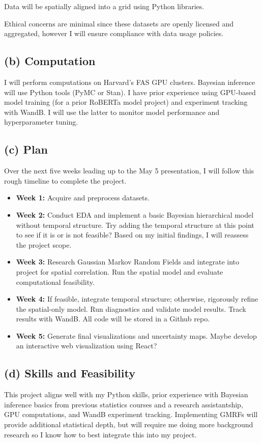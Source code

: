 \documentclass[12pt]{article}
\begin{document}
Data will be spatially aligned into a grid using Python libraries. 


Ethical concerns are minimal since these datasets are openly licensed and aggregated, however I will ensure compliance with data usage policies.

\subsection*{(b) Computation}
I will perform computations on Harvard's FAS GPU clusters. Bayesian inference will use Python tools (PyMC or Stan). I have prior experience using GPU-based model training (for a prior RoBERTa model project) and experiment tracking with WandB. I will use the latter to monitor model performance and hyperparameter tuning.

\subsection*{(c) Plan}
Over the next five weeks leading up to the May 5 presentation, I will follow this rough timeline to complete the project.
\begin{itemize}
    \item \textbf{Week 1:} Acquire and preprocess datasets.
    \item \textbf{Week 2:} Conduct EDA and implement a basic Bayesian hierarchical model without temporal structure. Try adding the temporal structure at this point to see if it is or is not feasible? Based on my initial findings, I will reassess the project scope. 
    \item \textbf{Week 3:} Research Gaussian Markov Random Fields and integrate into project for spatial correlation. Run the spatial model and evaluate computational feasibility.
    \item \textbf{Week 4:} If feasible, integrate temporal structure; otherwise, rigorously refine the spatial-only model. Run diagnostics and validate model results. Track results with WandB. All code will be stored in a Github repo.
    \item \textbf{Week 5:} Generate final visualizations and uncertainty maps. Maybe develop an interactive web visualization using React?
\end{itemize}

\subsection*{(d) Skills and Feasibility}
This project aligns well with my Python skills, prior experience with Bayesian inference basics from previous statistics courses and a research assistantship, GPU computations, and WandB experiment tracking. Implementing GMRFs will provide additional statistical depth, but will require me doing more  background research so I know how to best integrate this into my project.
\end{document}
